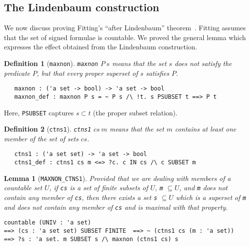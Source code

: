 \documentclass[a4paper]{article}
\newtheorem{lemma}{Lemma}
\newtheorem{definition}{Definition}
\begin{document}
\subsection{The Lindenbaum construction}

We now discuss proving Fitting's ``after
Lindenbaum'' theorem~\cite[Theorem~1]{fitting-dual-tableau}. 
Fitting assumes that the
set of signed formulae is countable.
%
We proved the general lemma which expresses 
the effect obtained from the Lindenbaum construction.

\begin{definition}[\texttt{maxnon}]\label{maxnon}
\texttt{maxnon} $P\ s$ means that the set $s$ does not satisfy the 
predicate $P$, but that every proper superset of $s$ satisfies $P$.
\begin{verbatim}
   maxnon : ('a set -> bool) -> 'a set -> bool
   maxnon_def : maxnon P s = ~ P s /\ !t. s PSUBSET t ==> P t 
\end{verbatim}
\end{definition}

Here, \texttt{PSUBSET} captures $s \subset t$ (the proper subset relation).

\begin{definition}[\texttt{ctns1}]\label{ctns1}
\texttt{ctns1} $cs\ m$ means that the set $m$ contains at least one member
of the set of sets $cs$.
\begin{verbatim}
   ctns1 : ('a set set) -> 'a set -> bool
   ctns1_def : ctns1 cs m <=> ?c. c IN cs /\ c SUBSET m
\end{verbatim}
\end{definition}

\begin{lemma}[\texttt{MAXNON\_CTNS1}] \label{MAXNON-CTNS1} Provided
  that we are dealing with members of a countable set $U$, if
  \texttt{cs} is a set of finite subsets of $U$,
  \texttt{m} $\subseteq U$, and \texttt{m}
  does not contain any member of \texttt{cs},
  then there exists a set \texttt{s} $\subseteq U$ 
  which is a superset of \texttt{m} and does not contain any
  member of \texttt{cs} and is maximal with that property.
\begin{verbatim}
countable (UNIV : 'a set) 
==> (cs : 'a set set) SUBSET FINITE  ==> ~ (ctns1 cs (m : 'a set)) 
==> ?s : 'a set. m SUBSET s /\ maxnon (ctns1 cs) s
\end{verbatim}
\end{lemma}

\end{document}
